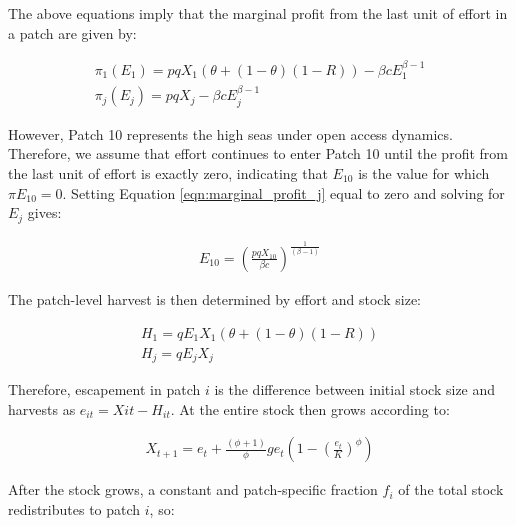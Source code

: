 \documentclass[9p,twocolumn,twoside,lineno]{pnas-new}
\begin{document}
\begin{scriptsize}
The above equations imply that the marginal profit from the last unit of effort in a patch are given by:

\begin{figure}[H]	
	\begin{align}
	\pi_1(E_1) = pqX_1(\theta + (1 - \theta)(1 - R)) - \beta cE_1^{\beta-1}
	\label{eqn:marginal_profit_1}
	\\
	\pi_j(E_j) = pqX_j - \beta cE_j^{\beta-1}
	\label{eqn:marginal_profit_j}
	\end{align}
\end{figure}

However, Patch 10 represents the high seas under open access dynamics. Therefore, we assume that effort continues to enter Patch 10 until the profit from the last unit of effort is exactly zero, indicating that $E_{10}$ is the value for which $\pi E_{10} = 0$. Setting Equation \ref{eqn:marginal_profit_j} equal to zero and solving for $E_j$ gives:

\begin{figure}[H]	
	\begin{align}
	E_{10} = \left(\frac{pqX_{10}}{\beta c}\right)^{\frac{1}{(\beta - 1)}}
	\label{eqn:effort_hs}
	\end{align}
\end{figure}

The patch-level harvest is then determined by effort and stock size:

\begin{figure}[H]	
	\begin{align}
	H_1 = qE_1X_1 (\theta + (1 - \theta)(1 - R))
	\label{eqn:harvest_1}
	\\
	H_j = qE_jX_j
	\label{eqn:harvest_j}
	\end{align}
\end{figure}

Therefore, escapement in patch $i$ is the difference between initial stock size and harvests as $e_{it} = X{it} - H_{it}$. At the entire stock then grows according to:

\begin{figure}[H]	
	\begin{align}
	X_{t+1} = e_t + \frac{(\phi + 1)}{\phi}ge_t\left(1 - \left(\frac{e_t}{K}\right) ^{\phi}\right)
	\label{eqn:grow}
	\end{align}
\end{figure}

After the stock grows, a constant and patch-specific fraction $f_i$ of the total stock redistributes to patch $i$, so:


\end{scriptsize}
\end{document}

